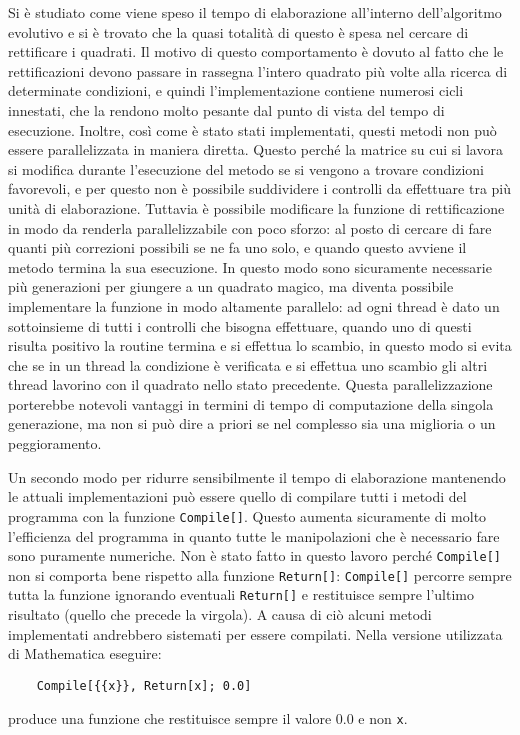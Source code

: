 \documentclass[italian,twoside,twocolumn]{article}
\begin{document}
Si è studiato come viene speso il tempo di elaborazione all'interno dell'algoritmo evolutivo e si è trovato che la quasi totalità di questo è spesa nel cercare di rettificare i quadrati. Il motivo di questo comportamento è dovuto al fatto che le rettificazioni devono passare in rassegna l'intero quadrato più volte alla ricerca di determinate condizioni, e quindi l'implementazione contiene numerosi cicli innestati, che la rendono molto pesante dal punto di vista del tempo di esecuzione. Inoltre, così come è stato stati implementati, questi metodi non può essere parallelizzata in maniera diretta. Questo perché la matrice su cui si lavora si modifica durante l'esecuzione del metodo se si vengono a trovare condizioni favorevoli, e per questo non è possibile suddividere i controlli da effettuare tra più unità di elaborazione. Tuttavia è possibile modificare la funzione di rettificazione in modo da renderla parallelizzabile con poco sforzo: al posto di cercare di fare quanti più correzioni possibili se ne fa uno solo, e quando questo avviene il metodo termina la sua esecuzione. In questo modo sono sicuramente necessarie più generazioni per giungere a un quadrato magico, ma diventa possibile implementare la funzione in modo altamente parallelo: ad ogni thread è dato un sottoinsieme di tutti i controlli che bisogna effettuare, quando uno di questi risulta positivo la routine termina e si effettua lo scambio, in questo modo si evita che se in un thread la condizione è verificata e si effettua uno scambio gli altri thread lavorino con il quadrato nello stato precedente. Questa parallelizzazione porterebbe notevoli vantaggi in termini di tempo di computazione della singola generazione, ma non si può dire a priori se nel complesso sia una miglioria o un peggioramento. 


Un secondo modo per ridurre sensibilmente il tempo di elaborazione mantenendo le attuali implementazioni può essere quello di compilare tutti i metodi del programma con la funzione \texttt{Compile[]}. Questo aumenta sicuramente di molto l'efficienza del programma in quanto tutte le manipolazioni che è necessario fare sono puramente numeriche. Non è stato fatto in questo lavoro perché \texttt{Compile[]} non si comporta bene rispetto alla funzione \texttt{Return[]}: \texttt{Compile[]} percorre sempre tutta la funzione ignorando eventuali \texttt{Return[]} e restituisce sempre l'ultimo risultato (quello che precede la virgola). A causa di ciò alcuni metodi implementati andrebbero sistemati per essere compilati. Nella versione utilizzata di Mathematica eseguire:
\begin{verbatim}
	Compile[{{x}}, Return[x]; 0.0]
\end{verbatim}
produce una funzione che restituisce sempre il valore 0.0 e non \texttt{x}.
\end{document}
